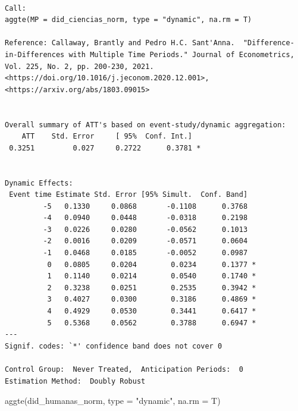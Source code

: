 \documentclass[
  letterpaper,
  DIV=11,
  numbers=noendperiod]{scrartcl}
\newenvironment{Shaded}{\begin{snugshade}}{\end{snugshade}}
\newcommand{\AttributeTok}[1]{\textcolor[rgb]{0.40,0.45,0.13}{#1}}
\newcommand{\FunctionTok}[1]{\textcolor[rgb]{0.28,0.35,0.67}{#1}}
\newcommand{\NormalTok}[1]{\textcolor[rgb]{0.00,0.23,0.31}{#1}}
\newcommand{\StringTok}[1]{\textcolor[rgb]{0.13,0.47,0.30}{#1}}
\begin{document}
\begin{verbatim}

Call:
aggte(MP = did_ciencias_norm, type = "dynamic", na.rm = T)

Reference: Callaway, Brantly and Pedro H.C. Sant'Anna.  "Difference-in-Differences with Multiple Time Periods." Journal of Econometrics, Vol. 225, No. 2, pp. 200-230, 2021. <https://doi.org/10.1016/j.jeconom.2020.12.001>, <https://arxiv.org/abs/1803.09015> 


Overall summary of ATT's based on event-study/dynamic aggregation:  
    ATT    Std. Error     [ 95%  Conf. Int.]  
 0.3251         0.027     0.2722      0.3781 *


Dynamic Effects:
 Event time Estimate Std. Error [95% Simult.  Conf. Band]  
         -5   0.1330     0.0868       -0.1108      0.3768  
         -4   0.0940     0.0448       -0.0318      0.2198  
         -3   0.0226     0.0280       -0.0562      0.1013  
         -2   0.0016     0.0209       -0.0571      0.0604  
         -1   0.0468     0.0185       -0.0052      0.0987  
          0   0.0805     0.0204        0.0234      0.1377 *
          1   0.1140     0.0214        0.0540      0.1740 *
          2   0.3238     0.0251        0.2535      0.3942 *
          3   0.4027     0.0300        0.3186      0.4869 *
          4   0.4929     0.0530        0.3441      0.6417 *
          5   0.5368     0.0562        0.3788      0.6947 *
---
Signif. codes: `*' confidence band does not cover 0

Control Group:  Never Treated,  Anticipation Periods:  0
Estimation Method:  Doubly Robust
\end{verbatim}

\begin{Shaded}
\begin{Highlighting}[]
\FunctionTok{aggte}\NormalTok{(did\_humanas\_norm, }\AttributeTok{type =} \StringTok{"dynamic"}\NormalTok{, }\AttributeTok{na.rm =}\NormalTok{ T)}
\end{Highlighting}
\end{Shaded}
\end{document}
